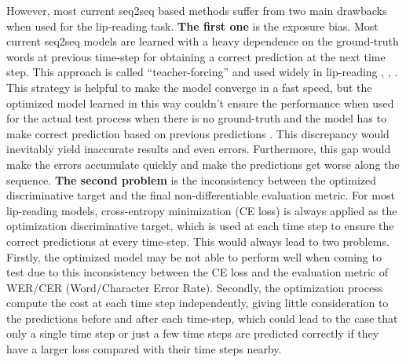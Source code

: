 \documentclass[a4paper, 10pt, conference]{ieeeconf}      %
\begin{document}
	However, most current seq2seq based methods suffer from two main drawbacks when used for the lip-reading task. 
	\textbf{The first one} is the exposure bias. Most current seq2seq models are learned with a heavy dependence on the ground-truth words at previous time-step for obtaining a correct prediction at the next time step. This approach is called ``teacher-forcing” \cite{Rennie} and used widely in lip-reading \cite{Chung2017}, \cite{Chung}, \cite{Afouras2018}. This strategy is helpful to make the model converge in a fast speed, but the optimized model learned in this way couldn't ensure the performance when used for the actual test process when there is no ground-truth and the model has to make correct prediction based on previous predictions \cite{Chopra2016}. This discrepancy would inevitably yield inaccurate results and even errors. Furthermore, this gap would make the errors accumulate quickly and make the predictions get worse along the sequence. %
	\textbf{The second problem} is the inconsistency between the optimized discriminative target and the final non-differentiable evaluation metric. For most lip-reading models, cross-entropy minimization (CE loss) is always applied as the optimization discriminative target, which is used at each time step to ensure the correct predictions at every time-step. This would always lead to two problems. Firstly, the optimized model may be not able to perform well when coming to test due to this inconsistency between the CE loss and the evaluation metric of WER/CER (Word/Character Error Rate). Secondly, the optimization process compute the cost at each time step independently,  giving little consideration to the predictions before and after each time-step, which could lead to the case that only a single time step or just a few time steps are predicted correctly if they have a larger loss compared with their time steps nearby.
	
	
	
\end{document}
